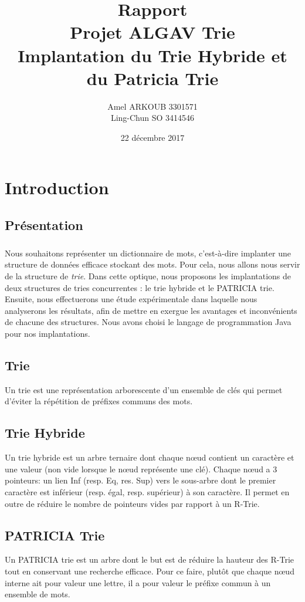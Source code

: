 \documentclass[a4paper,12pt]{report}
\title{\Huge Rapport \\ Projet ALGAV Trie \\ \large Implantation du Trie Hybride et du Patricia Trie}
\author{Amel ARKOUB 3301571 \\ Ling-Chun SO 3414546}
\date{22 décembre 2017}
\begin{document}
\maketitle

\tableofcontents
\newpage

\chapter{Introduction}
\section*{Présentation}
\paragraph*{}
Nous souhaitons représenter un dictionnaire de mots, c'est-à-dire implanter une structure de
données efficace stockant des mots. Pour cela, nous allons nous servir de la structure de {\itshape trie}.
Dans cette optique, nous proposons les implantations de deux structures de tries concurrentes : le trie hybride
et le PATRICIA trie. Ensuite, nous effectuerons une étude expérimentale dans laquelle nous analyserons les résultats, afin de mettre en exergue
les avantages et inconvénients de chacune des structures. Nous avons choisi le langage de programmation Java pour nos implantations.

\section*{Trie}
Un trie est une représentation arborescente d'un ensemble de clés qui permet d'éviter la répétition de préfixes communs des mots.

\section*{Trie Hybride}
Un trie hybride est un arbre ternaire dont chaque nœud contient un caractère et une valeur (non vide
lorsque le nœud représente une clé). Chaque nœud a 3 pointeurs: un lien Inf (resp. Eq, res. Sup) vers le sous-arbre dont le premier caractère est inférieur (resp. égal, resp. supérieur) à son caractère. Il permet en outre
de réduire le nombre de pointeurs vides par rapport à un R-Trie.

\section*{PATRICIA Trie}
Un PATRICIA trie est un arbre dont le but est de réduire la hauteur des R-Trie tout en conservant une recherche
efficace. Pour ce faire, plutôt que chaque nœud interne ait pour valeur une lettre, il a pour valeur le préfixe commun à un ensemble de mots.
\end{document}
